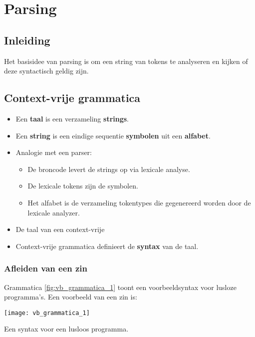 \chapter{Parsing}
\label{ch:parsing}

\section{Inleiding}
Het basisidee van parsing is om een string van tokens te analyseren en kijken of deze syntactisch geldig zijn.


\section{Context-vrije grammatica}
\begin{itemize}
	\item Een \textbf{taal} is een verzameling \textbf{strings}.
	\item Een \textbf{string} is een eindige sequentie \textbf{symbolen} uit een \textbf{alfabet}.
	\item Analogie met een parser:
	\begin{itemize}
		\item De broncode levert de strings op via lexicale analyse.
		\item De lexicale tokens zijn de symbolen.
		\item Het alfabet is de verzameling tokentypes die gegenereerd worden door de lexicale analyzer.
	\end{itemize}
	\item De taal van een context-vrije
	\item Context-vrije grammatica definieert de \textbf{syntax} van de taal.
\end{itemize}

\subsection{Afleiden van een zin}
Grammatica \ref{fig:vb_grammatica_1} toont een voorbeeldsyntax voor lusloze programma's. Een voorbeeld van een zin is:

\begin{grammarfigure}
	\texttt{[image: vb\_grammatica\_1]}
	\caption{Een syntax voor een lusloos programma.}
	\label{fig:vb_grammatica_1}
\end{grammarfigure}


